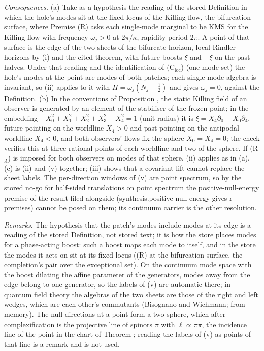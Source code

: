 \emph{Consequences.} (a) Take as a hypothesis the reading of the stored Definition in which the hole's modes sit at the fixed locus of the Killing flow, the bifurcation surface, where Premise (R) asks each single-mode marginal to be KMS for the Killing flow with frequency $\omega_{j} > 0$ at $2\pi/\kappa$, rapidity period $2\pi$. A point of that surface is the edge of the two sheets of the bifurcate horizon, local Rindler horizons by (i) and the cited theorem, with future boosts $\xi$ and $-\xi$ on the past halves. Under that reading and the identification of (C$_{\mathrm{loc}}$) (one mode set) the hole's modes at the point are modes of both patches; each single-mode algebra is invariant, so (ii) applies to it with $H = \omega_{j}(N_{j} - \tfrac12)$ and gives $\omega_{j} = 0$, against the Definition. (b) In the conventions of Proposition , the static Killing field of an observer is generated by an element of the stabiliser of the frozen point; in the embedding $-X_{0}^{2} + X_{1}^{2} + X_{2}^{2} + X_{3}^{2} + X_{4}^{2} = 1$ (unit radius) it is $\xi = X_{4}\partial_{0} + X_{0}\partial_{4}$, future pointing on the worldline $X_{4} > 0$ and past pointing on the antipodal worldline $X_{4} < 0$, and both observers' flows fix the sphere $X_{0} = X_{4} = 0$; the check verifies this at three rational points of each worldline and two of the sphere. If (R$_{\Lambda}$) is imposed for both observers on modes of that sphere, (ii) applies as in (a). (c) is (ii) and (v) together; (iii) shows that a covariant lift cannot replace the sheet labels. The per-direction windows of (v) are point spectrum, so by the stored no-go for half-sided translations on point spectrum the positive-null-energy premise of the result filed alongside (synthesis.positive-null-energy-gives-r-premises) cannot be posed on them; its continuum carrier is the other resolution.

\emph{Remarks.} The hypothesis that the patch's modes include modes at its edge is a reading of the stored Definition, not stored text; it is how the store places modes for a phase-acting boost: such a boost maps each mode to itself, and in the store the modes it acts on sit at its fixed locus ((R) at the bifurcation surface, the completion's pair over the exceptional set). On the continuum mode space with the boost dilating the affine parameter of the generators, modes away from the edge belong to one generator, so the labels of (v) are automatic there; in quantum field theory the algebras of the two sheets are those of the right and left wedges, which are each other's commutants (Bisognano and Wichmann; from memory). The null directions at a point form a two-sphere, which after complexification is the projective line of spinors $\pi$ with $\ell \propto \pi\bar\pi$, the incidence line of the point in the chart of Theorem ; reading the labels of (v) as points of that line is a remark and is not used.
